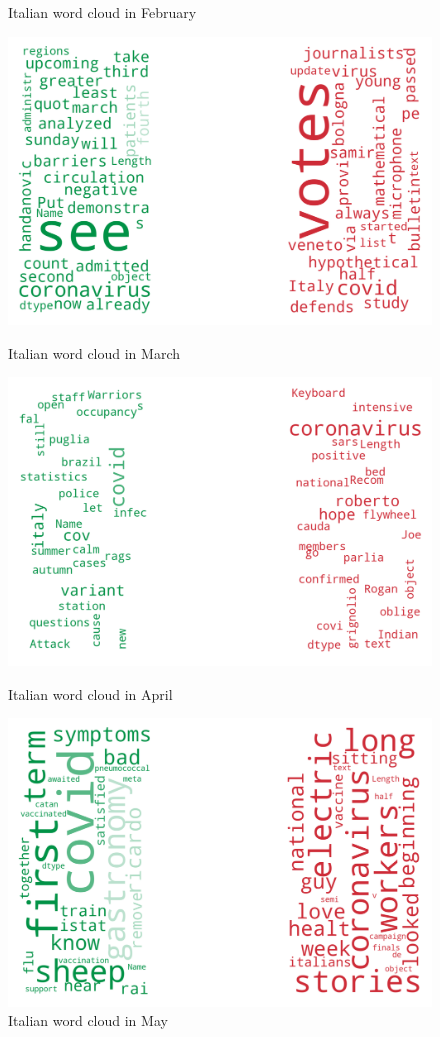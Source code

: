 \begin{landscape}
\begin{figure}[!htb]
  \caption{Italian word cloud in February}\label{fig:februaryit}
\endminipage
\end{figure}
\begin{figure}[!htb]
  \includegraphics[width=\linewidth]{March it word cloud.png}
  \caption{Italian word cloud in March}\label{fig:marchit}
\endminipage\hfill
{}
  \includegraphics[width=\linewidth]{April it word cloud.png}
  \caption{Italian word cloud in April}\label{fig:aprilit}
\endminipage\hfill
{}
  \includegraphics[width=\linewidth]{May it word cloud.png}
  \caption{Italian word cloud in May}\label{fig:mayit}
\endminipage
\end{figure}


\end{landscape}
